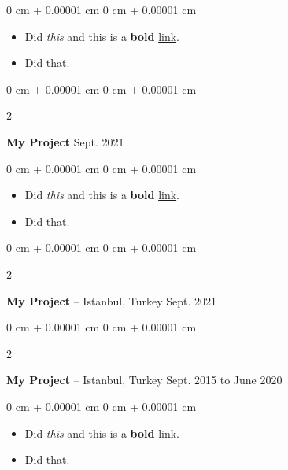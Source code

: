 \documentclass[10pt, letterpaper]{article}
\newenvironment{highlights}{
    \begin{itemize}[
        topsep=0.10 cm,
        parsep=0.10 cm,
        partopsep=0pt,
        itemsep=0pt,
        leftmargin=0 cm + 10pt
    ]
}{
    \end{itemize}
        
    \vspace{-0.10cm}
} %
\newenvironment{onecolentry}{
    \begin{adjustwidth}{
        0 cm + 0.00001 cm
    }{
        0 cm + 0.00001 cm
    }
}{
    \end{adjustwidth}
} %
\newenvironment{twocolentry}[2][]{
    \onecolentry
    \def\secondColumn{#2}
    \setcolumnwidth{\fill, 4.1 cm}
    \begin{paracol}{2}
}{
    \switchcolumn \raggedleft \secondColumn
    \end{paracol}
    \endonecolentry
} %
\begin{document}
        \vspace{0.10 cm}
        \begin{onecolentry}
            \begin{highlights}
                \item Did \textit{this} and this is a \textbf{bold} \href{https://example.com}{link}.
                \item Did that.
            \end{highlights}
        \end{onecolentry}


        \vspace{0.15 cm}

        \begin{twocolentry}{
            Sept. 2021
        }
            \textbf{My Project}\end{twocolentry}

        \vspace{0.10 cm}
        \begin{onecolentry}
            \begin{highlights}
                \item Did \textit{this} and this is a \textbf{bold} \href{https://example.com}{link}.
                \item Did that.
            \end{highlights}
        \end{onecolentry}


        \vspace{0.15 cm}

        \begin{twocolentry}{
            Sept. 2021
        }
            \textbf{My Project} -- Istanbul, Turkey\end{twocolentry}

        \vspace{0.10 cm}


        \vspace{0.15 cm}

        \begin{twocolentry}{
            Sept. 2015 to June 2020
        }
            \textbf{My Project} -- Istanbul, Turkey\end{twocolentry}

        \vspace{0.10 cm}
        \begin{onecolentry}
            \begin{highlights}
                \item Did \textit{this} and this is a \textbf{bold} \href{https://example.com}{link}.
                \item Did that.
            \end{highlights}
        \end{onecolentry}
\end{document}
